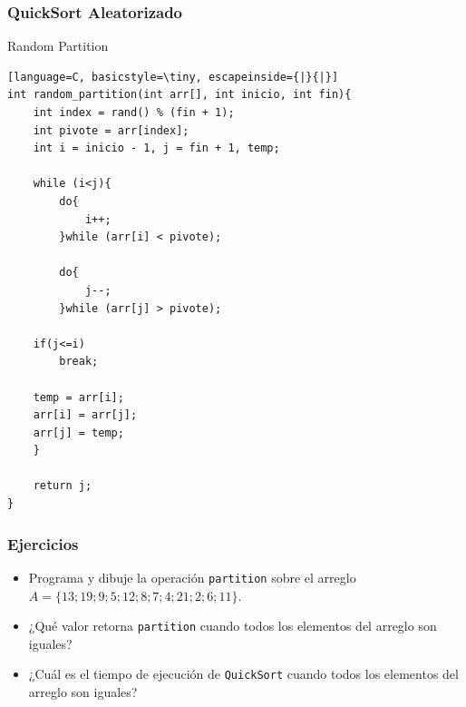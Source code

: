 \documentclass{beamer}
\begin{document}
\begin{frame}[fragile]
 \frametitle{QuickSort Aleatorizado}
\begin{exampleblock}{Random Partition}
\begin{lstlisting}[language=C, basicstyle=\tiny, escapeinside={|}{|}]
int random_partition(int arr[], int inicio, int fin){
    int index = rand() % (fin + 1);
    int pivote = arr[index];
    int i = inicio - 1, j = fin + 1, temp;
 
    while (i<j){
        do{
            i++;
        }while (arr[i] < pivote);
 
        do{
            j--;
        }while (arr[j] > pivote);

	if(j<=i)
		break;
	 
	temp = arr[i];
	arr[i] = arr[j];
	arr[j] = temp;
    }

    return j;
}
\end{lstlisting}
\end{exampleblock}
\end{frame}

\begin{frame}[fragile]
 \frametitle{Ejercicios}
\begin{itemize}
\item Programa y dibuje la operación \texttt{partition} sobre el arreglo $A = \{13; 19; 9; 5; 12; 8; 7; 4; 21; 2; 6; 11\}$.
\item ¿Qué valor retorna \texttt{partition} cuando todos los elementos del arreglo son iguales?
\item ¿Cuál es el tiempo de ejecución de \texttt{QuickSort} cuando todos los elementos del arreglo son iguales?
\end{itemize}
\end{frame}
\end{document}
